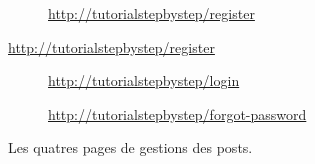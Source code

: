 \documentclass[internal]{nhitec_design}
\begin{document}
\begin{figure}[!h]
    \begin{subfigure}[c]{0.73\textwidth}
    \end{subfigure}\hfill
    \begin{subfigure}[c]{0.24\textwidth}
        \caption{\url{http://tutorialstepbystep/register}} 
    \end{subfigure}
\end{figure}
\begin{figure}[!h]\ContinuedFloat{}
    \begin{subfigure}[c]{0.73\textwidth}
    \end{subfigure}\hfill
    \begin{subfigure}[c]{0.24\textwidth}
        \caption{\url{http://tutorialstepbystep/login}} 
    \end{subfigure}
    \begin{subfigure}[c]{0.73\textwidth}
    \end{subfigure}\hfill
    \begin{subfigure}[c]{0.24\textwidth}
        \caption{\url{http://tutorialstepbystep/forgot-password}\label{fig:auth_forgot}} 
    \end{subfigure}
    \caption{Les quatres pages de gestions des posts.}
\end{figure}
\end{document}
